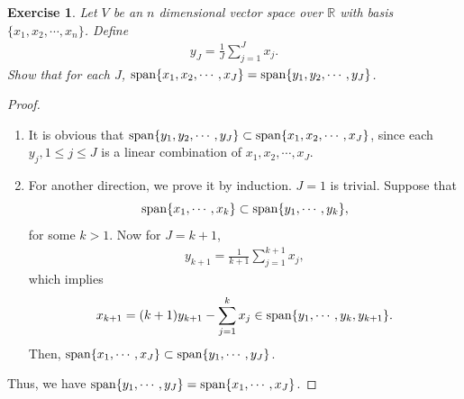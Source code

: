 \documentclass[11pt]{book}
\newtheorem{exercise}{Exercise}[section]
\theoremstyle{definition}
\numberwithin{equation}{chapter}
\begin{document}
\medskip

\begin{exercise}
Let $V$ be an $n$ dimensional vector space over $\mathbb{R}$ with basis $\{x_1, x_2, \cdots, x_n\}$. Define 
\begin{align*}
    y_J = \frac{1}{J} \sum^J_{j=1} x_j.
\end{align*}
Show that for each $J$, ${\rm span} \{x_1, x_2, \cdots, x_J\} = {\rm span} \{y_1, y_2, \cdots, y_J\}$.
\end{exercise}
\begin{proof}
~\begin{enumerate}[label=(\alph*)]
    \item It is obvious that ${\rm span} \{y_1, y_2, \cdots, y_J\} \subset {\rm span} \{x_1, x_2, \cdots, x_J\}$, since each $y_j, 1 \leq j \leq J$ is a linear combination of $x_1, x_2, \cdots, x_J$.
    
    \item For another direction, we prove it by induction. $J = 1$ is trivial. Suppose that $${\rm span} \{x_1, \cdots, x_k\} \subset {\rm span} \{y_1, \cdots, y_k\},$$ 
    for some $k > 1$. Now for $J = k + 1$, 
    \begin{align*}
        y_{k+1} = \frac{1}{k+1} \sum^{k+1}_{j=1} x_j,
    \end{align*}
    which implies
    \begin{align*}
        x_{k+1} = (k+1) y_{k+1} - \sum^k_{j=1} x_j \in {\rm span} \{y_1, \cdots, y_k, y_{k+1}\}.
    \end{align*}
    Then, ${\rm span} \{x_1, \cdots, x_J\} \subset {\rm span} \{y_1, \cdots, y_J\}$.
\end{enumerate}
Thus, we have ${\rm span} \{y_1, \cdots, y_J\} = {\rm span} \{x_1, \cdots, x_J\}$.
\end{proof}

\medskip
\end{document}
